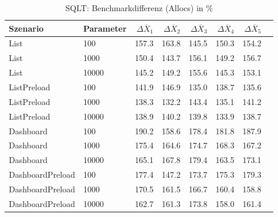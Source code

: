 
\begin{table}[ht]
\setlength{\extrarowheight}{-1pt}
\centering
\caption{SQLT: Benchmarkdifferenz (Allocs) in \%}
\begin{tabular}{llrrrrrr}
\toprule
Szenario & Parameter & ${\Delta \overline{X}_1}$ & ${\Delta \overline{X}_2}$ & ${\Delta \overline{X}_3}$ & ${\Delta \overline{X}_4}$ & ${\Delta \overline{X}_5}$ \\
\midrule
	List & 100 & \cellcolor{red!30}  157.3 & \cellcolor{red!30}  163.8 & \cellcolor{red!28}  145.5 & \cellcolor{red!30}  150.3 & \cellcolor{red!30}  154.2 \\
	List & 1000 & \cellcolor{red!30}  150.4 & \cellcolor{red!27}  143.7 & \cellcolor{red!30}  156.1 & \cellcolor{red!30}  149.2 & \cellcolor{red!30}  156.7 \\
	List & 10000 & \cellcolor{red!28}  145.2 & \cellcolor{red!30}  149.2 & \cellcolor{red!30}  155.6 & \cellcolor{red!28}  145.3 & \cellcolor{red!30}  153.1 \\
	ListPreload & 100 & \cellcolor{red!27}  141.9 & \cellcolor{red!29}  146.9 & \cellcolor{red!24}  135.0 & \cellcolor{red!25}  138.7 & \cellcolor{red!24}  135.6 \\
	ListPreload & 1000 & \cellcolor{red!25}  138.3 & \cellcolor{red!23}  132.2 & \cellcolor{red!27}  143.4 & \cellcolor{red!24}  135.1 & \cellcolor{red!26}  141.2 \\
	ListPreload & 10000 & \cellcolor{red!26}  138.9 & \cellcolor{red!26}  140.2 & \cellcolor{red!26}  139.8 & \cellcolor{red!24}  133.9 & \cellcolor{red!25}  138.7 \\
	Dashboard & 100 & \cellcolor{red!30}  190.2 & \cellcolor{red!30}  158.6 & \cellcolor{red!30}  178.4 & \cellcolor{red!30}  181.8 & \cellcolor{red!30}  187.9 \\
	Dashboard & 1000 & \cellcolor{red!30}  175.4 & \cellcolor{red!30}  164.6 & \cellcolor{red!30}  174.7 & \cellcolor{red!30}  168.3 & \cellcolor{red!30}  167.2 \\
	Dashboard & 10000 & \cellcolor{red!30}  165.1 & \cellcolor{red!30}  167.8 & \cellcolor{red!30}  179.4 & \cellcolor{red!30}  163.5 & \cellcolor{red!30}  173.1 \\
	DashboardPreload & 100 & \cellcolor{red!30}  177.4 & \cellcolor{red!29}  147.2 & \cellcolor{red!30}  173.7 & \cellcolor{red!30}  175.3 & \cellcolor{red!30}  179.3 \\
	DashboardPreload & 1000 & \cellcolor{red!30}  170.5 & \cellcolor{red!30}  161.5 & \cellcolor{red!30}  166.7 & \cellcolor{red!30}  160.4 & \cellcolor{red!30}  158.8 \\
	DashboardPreload & 10000 & \cellcolor{red!30}  162.7 & \cellcolor{red!30}  161.3 & \cellcolor{red!30}  173.8 & \cellcolor{red!30}  158.0 & \cellcolor{red!30}  161.4 \\
\bottomrule
\end{tabular}
\label{tab:benchmarkdifferenz_sqlt_allocs}
\end{table}
	